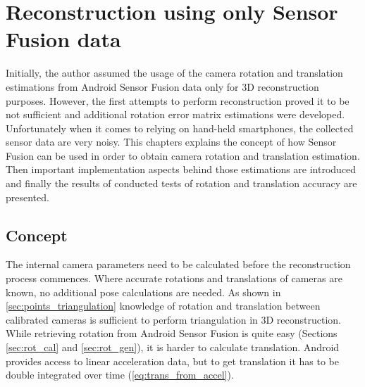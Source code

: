 \ifpdf
    \graphicspath{{figures/}{figures/comparisons}}
\else
    \graphicspath{{figures/}{figures/comparisons}}
\fi

\chapter{Reconstruction using only Sensor Fusion data}\label{chap:recon_sensors}
Initially, the author assumed the usage of the camera rotation and translation estimations from Android Sensor Fusion data only for 3D reconstruction purposes. However, the first attempts to perform reconstruction proved it to be not sufficient and additional rotation error matrix estimations were developed. Unfortunately when it comes to relying on hand-held smartphones, the collected sensor data are very noisy. This chapters explains the concept of how Sensor Fusion can be used in order to obtain camera rotation and translation estimation. Then important implementation aspects behind those estimations are introduced and finally the results of conducted tests of rotation and translation accuracy are presented.
\section{Concept}
The internal camera parameters need to be calculated before the reconstruction process commences.
Where accurate rotations and translations of cameras are known, no additional pose calculations are needed. As shown in \ref{sec:points_triangulation} knowledge of rotation and translation between calibrated cameras is sufficient to perform triangulation in 3D reconstruction. While retrieving rotation from Android Sensor Fusion is quite easy (Sections \ref{sec:rot_cal} and \ref{sec:rot_gen}), it is harder to calculate translation. Android provides access to linear acceleration data, but to get translation it has to be double integrated over time (\ref{eq:trans_from_accel}).
